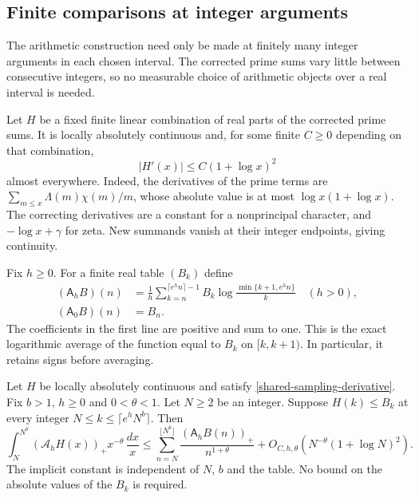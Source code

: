 \subsection{Finite comparisons at integer arguments}
\label{shared-finite-sampling}

The arithmetic construction need only be made at finitely many integer
arguments in each chosen interval. The corrected prime sums vary little
between consecutive integers, so no measurable choice of arithmetic
objects over a real interval is needed.

Let $H$ be a fixed finite linear combination of real parts of the
corrected prime sums. It is locally absolutely continuous and, for
some finite $C\ge0$ depending on that combination,
\begin{equation}\label{shared-sampling-derivative}
                         |H'(x)|\le C(1+\log x)^2
\end{equation}
almost everywhere. Indeed, the derivatives of the prime terms are
$\sum_{m\le x}\Lambda(m)\chi(m)/m$, whose absolute value is at most
$\log x(1+\log x)$. The correcting derivatives are a constant for
a nonprincipal character, and $-\log x+\gamma$ for zeta.
New summands vanish at their integer endpoints, giving continuity.

Fix $h\ge0$. For a finite real table $(B_k)$ define
\begin{equation}\label{shared-discrete-average}
 \begin{split}
 (\mathsf A_hB)(n)&=
  \frac1h\sum_{k=n}^{\lceil e^hn\rceil-1}
       B_k\log\frac{\min\{k+1,e^hn\}}k \quad(h>0),\\
 (\mathsf A_0B)(n)&=B_n.
 \end{split}
\end{equation}
The coefficients in the first line are positive and sum to one.
This is the exact logarithmic average of the function equal to $B_k$
on $[k,k+1)$. In particular, it retains signs before averaging.

\begin{lemma}\label{shared-integer-table}
Let $H$ be locally absolutely continuous and satisfy
\eqref{shared-sampling-derivative}. Fix $b>1$,
$h\ge0$ and $0<\theta<1$. Let $N\ge2$ be an integer. Suppose
$H(k)\le B_k$ at every integer
$N\le k\le\lceil e^hN^b\rceil$. Then
\begin{equation}\label{shared-integer-bound}
 \int_N^{N^b}(\mathcal A_hH(x))_+x^{-\theta}\,\frac{dx}{x}
 \le \sum_{n=N}^{\lfloor N^b\rfloor}
       \frac{(\mathsf A_hB(n))_+}{n^{1+\theta}}
       +O_{C,h,\theta}\!\left(N^{-\theta}(1+\log N)^2\right).
\end{equation}
The implicit constant is independent of $N$, $b$ and the table.
No bound on the absolute values of the $B_k$ is required.
\end{lemma}

